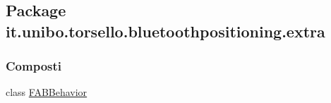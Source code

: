 \hypertarget{namespaceit_1_1unibo_1_1torsello_1_1bluetoothpositioning_1_1extra}{}\subsection{Package it.\+unibo.\+torsello.\+bluetoothpositioning.\+extra}
\label{namespaceit_1_1unibo_1_1torsello_1_1bluetoothpositioning_1_1extra}
\subsubsection*{Composti}
\begin{DoxyCompactItemize}
\item 
class \hyperlink{classit_1_1unibo_1_1torsello_1_1bluetoothpositioning_1_1extra_1_1FABBehavior}{F\+A\+B\+Behavior}
\end{DoxyCompactItemize}
